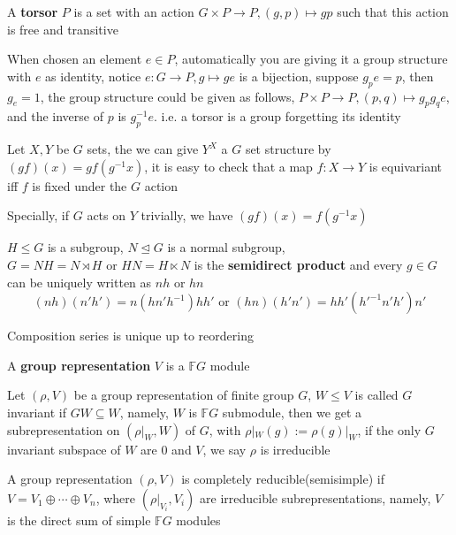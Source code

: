 \documentclass[main]{subfiles}
\begin{document}
\begin{definition}\label{Torsor}
A \textbf{torsor} $P$ is a set with an action $G\times P\to P, (g,p)\mapsto gp$ such that this action is free and transitive \par
When chosen an element $e\in P$, automatically you are giving it a group structure with $e$ as identity, notice $e: G\to P, g\mapsto ge$ is a bijection, suppose $g_pe=p$, then $g_e=1$, the group structure could be given as follows, $P\times P\to P, (p,q)\mapsto g_pg_qe$, and the inverse of $p$ is $g_p^{-1}e$. i.e. a torsor is a group forgetting its identity
\end{definition}

\begin{definition}
Let $X,Y$ be $G$ sets, the we can give $Y^X$ a $G$ set structure by $(gf)(x)=gf(g^{-1}x)$, it is easy to check that a map $f:X\to Y$ is equivariant iff $f$ is fixed under the $G$ action \par
Specially, if $G$ acts on $Y$ trivially, we have $(gf)(x)=f(g^{-1}x)$
\end{definition}

\begin{definition}
$H\leq G$ is a subgroup, $N\trianglelefteq G$ is a normal subgroup, $G=NH=N\rtimes H\text{ or }HN=H\ltimes N$ is the \textbf{semidirect product} and every $g\in G$ can be uniquely written as $nh$ or $hn$
\[(nh)(n'h')=n(hn'h^{-1})hh'\text{ or }(hn)(h'n')=hh'(h'^{-1}n'h')n'\]
\end{definition}

\begin{theorem}
Composition series is unique up to reordering
\end{theorem}

\begin{definition}
A \textbf{group representation} $V$ is a $\mathbb FG$ module
\end{definition}

\begin{definition}
Let $(\rho,V)$ be a group representation of finite group $G$, $W\leq V$ is called $G$ invariant if $GW\subseteq W$, namely, $W$ is $\mathbb FG$ submodule, then we get a subrepresentation on $(\rho|_W,W)$ of $G$, with $\rho|_W(g):=\rho(g)|_W$, if the only $G$ invariant subspace of $W$ are $0$ and $V$, we say $\rho$ is irreducible
\end{definition}

\begin{definition}
A group representation $(\rho,V)$ is completely reducible(semisimple) if $V=V_1\oplus\cdots\oplus V_n$, where $(\rho|_{V_i},V_i)$ are irreducible subrepresentations, namely, $V$ is the direct sum of simple $\mathbb FG$ modules
\end{definition}
\end{document}
